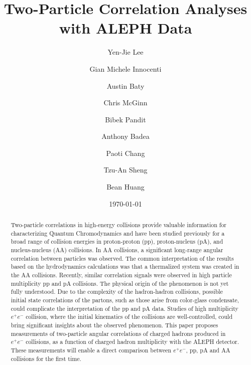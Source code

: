 \documentclass[aps,prl,twocolumn,showpacs,superscriptaddress,groupedaddress]{revtex4}  %
\begin{document}
\widetext
{}

\title{Two-Particle Correlation Analyses with ALEPH Data}
\author{Yen-Jie Lee}
\author{Gian Michele Innocenti}
\author{Austin Baty}
\author{Chris McGinn}
\author{Bibek Pandit}
\author{Anthony Badea}
%
\author{Paoti Chang}
\author{Tzu-An Sheng}
\author{Bean Huang}
%
\date{\today}


\begin{abstract}
Two-particle correlations in high-energy collisions provide valuable information for characterizing Quantum Chromodynamics and have been studied previously for a broad range of collision energies in proton-proton (pp), proton-nucleus (pA), and nucleus-nucleus (AA) collisions. In AA collisions, a significant long-range angular correlation between particles was observed. The common interpretation of the results based on the hydrodynamics calculations was that a thermalized system was created in the AA collisions. Recently, similar correlation signals were observed in high particle multiplicity pp and pA collisions. The physical origin of the phenomenon is not yet fully understood. Due to the complexity of the hadron-hadron collisions, possible initial state correlations of the partons, such as those arise from color-glass condensate, could complicate the interpretation of the pp and pA data. Studies of high multiplicity $e^+e^-$ collision, where the initial kinematics of the collisions are well-controlled, could bring significant insights about the observed phenomenon. This paper proposes measurements of two-particle angular correlations of charged hadrons produced in $e^+e^-$ collisions, as a function of charged hadron multiplicity with the ALEPH detector. These measurements will enable a direct comparison between $e^+e^-$, pp, pA and AA collisions for the first time.
\end{abstract}

\pacs{}
\maketitle
\end{document}
